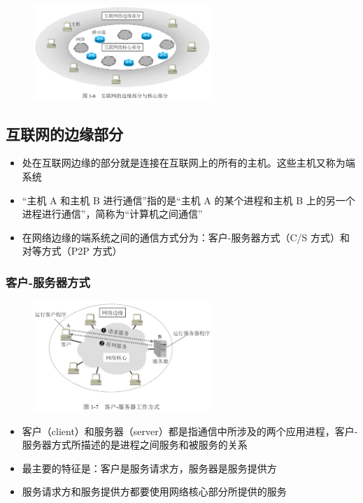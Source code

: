 \documentclass[cs4size,a4paper,10pt]{ctexart}
\begin{document}
	\begin{figure}[H]
		\centering
		\includegraphics[width=0.6\textwidth]{img/1.6}
	\end{figure}

	\subsection{互联网的边缘部分}
	\begin{itemize}
		\item 处在互联网边缘的部分就是连接在互联网上的所有的主机。这些主机又称为端系统
		\item “主机 A 和主机 B 进行通信”指的是“主机 A 的某个进程和主机 B 上的另一个进程进行通信”，简称为“计算机之间通信”
		\item 在网络边缘的端系统之间的通信方式分为：客户-服务器方式（C/S 方式）和对等方式（P2P 方式）
	\end{itemize}

	\subsubsection{客户-服务器方式}
	\begin{figure}[H]
		\centering
		\includegraphics[width=0.6\textwidth]{img/1.7}
	\end{figure}
	\begin{itemize}
		\item 客户（client）和服务器（server）都是指通信中所涉及的两个应用进程，客户-服务器方式所描述的是进程之间服务和被服务的关系
		\item 最主要的特征是：客户是服务请求方，服务器是服务提供方
		\item 服务请求方和服务提供方都要使用网络核心部分所提供的服务
	\end{itemize}
\end{document}
